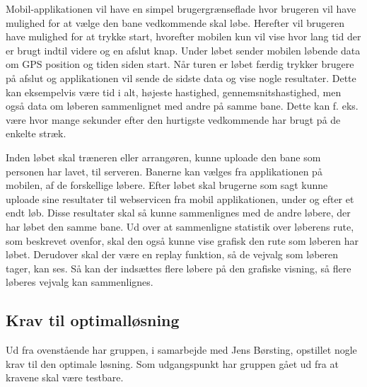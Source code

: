 Mobil-applikationen vil have en simpel brugergrænseflade hvor brugeren vil have mulighed for at vælge den bane vedkommende skal løbe. Herefter vil brugeren have mulighed for at trykke start, hvorefter mobilen kun vil vise hvor lang tid der er brugt indtil videre og en afslut knap. Under løbet sender mobilen løbende data om GPS position og tiden siden start. Når turen er løbet færdig trykker brugere på afslut og applikationen vil sende de sidste data og vise nogle resultater. Dette kan eksempelvis være tid i alt, højeste hastighed, gennemsnitshastighed, men også data om løberen sammenlignet med andre på samme bane. Dette kan f. eks. være hvor mange sekunder efter den hurtigste vedkommende har brugt på de enkelte stræk.

Inden løbet skal træneren eller arrangøren, kunne uploade den bane som personen har lavet, til serveren. Banerne kan vælges fra applikationen på mobilen, af de forskellige løbere. Efter løbet skal brugerne som sagt kunne uploade sine resultater til webservicen fra mobil applikationen, under og efter et endt løb. Disse resultater skal så kunne sammenlignes med de andre løbere, der har løbet den samme bane. Ud over at sammenligne statistik over løberens rute, som beskrevet ovenfor, skal den også kunne vise grafisk den rute som løberen har løbet. Derudover skal der være en replay funktion, så de vejvalg som løberen tager, kan ses. Så kan der indsættes flere løbere på den grafiske visning, så flere løberes vejvalg kan sammenlignes.

\subsection{Krav til optimalløsning}
Ud fra ovenstående har gruppen, i samarbejde med Jens Børsting, opstillet nogle krav til den optimale løsning. Som udgangspunkt har gruppen gået ud fra at kravene skal være testbare. 


